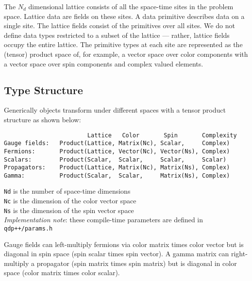 \documentclass[12pt,letterpaper]{article}
\begin{document}
The $N_d$ dimensional lattice consists of all the space-time sites in
the problem space.  Lattice data are fields on these sites.  A data
primitive describes data on a single site.  The lattice fields consist
of the primitives over all sites.  We do not define data types
restricted to a subset of the lattice --- rather, lattice fields occupy
the entire lattice.
The primitive types at
each site are represented as the (tensor) product space of, for
example, a vector space over color components with a vector space over
spin components and complex valued elements.

\subsection{Type Structure}
\label{sec:typestructure}

Generically objects transform under different spaces with a tensor
product structure as shown below:

\begin{verbatim}
                        Lattice   Color       Spin       Complexity
Gauge fields:   Product(Lattice, Matrix(Nc), Scalar,     Complex)
Fermions:       Product(Lattice, Vector(Nc), Vector(Ns), Complex)
Scalars:        Product(Scalar,  Scalar,     Scalar,     Scalar)
Propagators:    Product(Lattice, Matrix(Nc), Matrix(Ns), Complex)
Gamma:          Product(Scalar,  Scalar,     Matrix(Ns), Complex)
\end{verbatim}

\noindent
\verb|Nd| is the number of space-time dimensions\\
\noindent
\verb|Nc| is the dimension of the color vector space\\
\noindent
\verb|Ns| is the dimension of the spin vector space\\
\noindent
{\em Implementation note}: these compile-time parameters are defined 
in  {\tt qdp++/params.h}

Gauge fields can left-multiply fermions via color matrix times color
vector but is diagonal in spin space (spin scalar times spin vector).
A gamma matrix can right-multiply a propagator (spin matrix times
spin matrix) but is diagonal in color space (color matrix times color
scalar).
\end{document}

